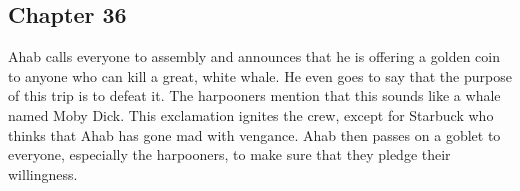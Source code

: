 \subsection{Chapter 36}

Ahab calls everyone to assembly and announces that he is offering a golden coin
to anyone who can kill a great, white whale. He even goes to say that the
purpose of this trip is to defeat it. The harpooners mention that this sounds
like a whale named Moby Dick. This exclamation ignites the crew, except for
Starbuck who thinks that Ahab has gone mad with vengance. Ahab then passes on a
goblet to everyone, especially the harpooners, to make sure that they pledge
their willingness.
